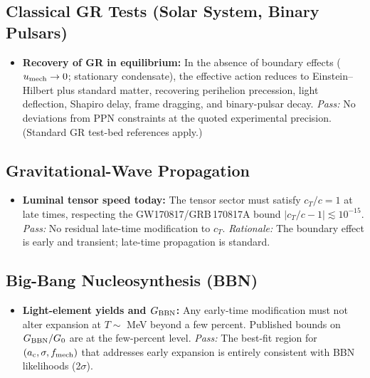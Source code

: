 \documentclass[11pt,a4paper]{article}
\newcommand{\ac}{a_{\rm c}}
\begin{document}
\subsection{Classical GR Tests (Solar System, Binary Pulsars)}
\begin{itemize}[leftmargin=1.8em]
\item \textbf{Recovery of GR in equilibrium:} In the absence of boundary effects ($u_{\rm mech}\to 0$; stationary condensate), the effective action reduces to Einstein–Hilbert plus standard matter, recovering perihelion precession, light deflection, Shapiro delay, frame dragging, and binary-pulsar decay. \emph{Pass:} No deviations from PPN constraints at the quoted experimental precision. (Standard GR test-bed references apply.)
\end{itemize}

\subsection{Gravitational-Wave Propagation}
\begin{itemize}[leftmargin=1.8em]
\item \textbf{Luminal tensor speed today:} The tensor sector must satisfy $c_T/c=1$ at late times, respecting the GW170817/GRB\,170817A bound $|c_T/c-1|\lesssim 10^{-15}$. \emph{Pass:} No residual late-time modification to $c_T$. \emph{Rationale:} The boundary effect is early and transient; late-time propagation is standard. 
\end{itemize}

\subsection{Big-Bang Nucleosynthesis (BBN)}
\begin{itemize}[leftmargin=1.8em]
\item \textbf{Light-element yields and $G_{\rm BBN}$:} Any early-time modification must not alter expansion at $T\!\sim$ MeV beyond a few percent. Published bounds on $G_{\rm BBN}/G_0$ are at the few-percent level. \emph{Pass:} The best-fit region for $(\ac,\sigma,f_{\rm mech})$ that addresses early expansion is entirely consistent with BBN likelihoods (2$\sigma$). 
\end{itemize}
\end{document}
